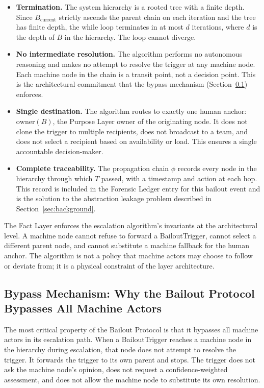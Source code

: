 \begin{itemize}\setlength\itemsep{0.25em}
\item \textbf{Termination.} The system hierarchy is a rooted tree with a finite depth. Since $B_{\text{current}}$ strictly ascends the parent chain on each iteration and the tree has finite depth, the while loop terminates in at most $d$ iterations, where $d$ is the depth of $B$ in the hierarchy. The loop cannot diverge.
\item \textbf{No intermediate resolution.} The algorithm performs no autonomous reasoning and makes no attempt to resolve the trigger at any machine node. Each machine node in the chain is a transit point, not a decision point. This is the architectural commitment that the bypass mechanism (Section~\ref{sec:bypass-mechanism}) enforces.
\item \textbf{Single destination.} The algorithm routes to exactly one human anchor: $\text{owner}(B)$, the Purpose Layer owner of the originating node. It does not clone the trigger to multiple recipients, does not broadcast to a team, and does not select a recipient based on availability or load. This ensures a single accountable decision-maker.
\item \textbf{Complete traceability.} The propagation chain $\phi$ records every node in the hierarchy through which $T$ passed, with a timestamp and action at each hop. This record is included in the Forensic Ledger entry for this bailout event and is the solution to the abstraction leakage problem described in Section~\ref{sec:background}.
\end{itemize}

The Fact Layer enforces the escalation algorithm's invariants at the architectural level. A machine node cannot refuse to forward a BailoutTrigger, cannot select a different parent node, and cannot substitute a machine fallback for the human anchor. The algorithm is not a policy that machine actors may choose to follow or deviate from; it is a physical constraint of the layer architecture.

\subsection{Bypass Mechanism: Why the Bailout Protocol Bypasses All Machine Actors}
\label{sec:bypass-mechanism}

The most critical property of the Bailout Protocol is that it bypasses all machine actors in its escalation path. When a BailoutTrigger reaches a machine node in the hierarchy during escalation, that node does not attempt to resolve the trigger. It forwards the trigger to its own parent and stops. The trigger does not ask the machine node's opinion, does not request a confidence-weighted assessment, and does not allow the machine node to substitute its own resolution.

